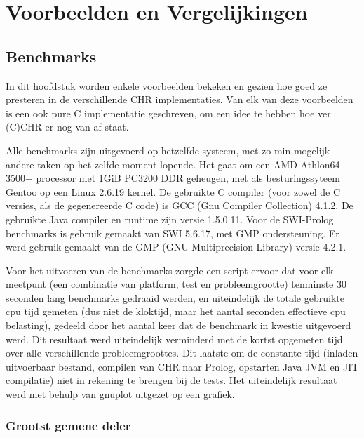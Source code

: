 \chapter{Voorbeelden en Vergelijkingen} \label{chap:bench}

\section{Benchmarks}

\newcommand{\benchfig}[2]{
\begin{figure}[htbp]
\begin{center}
\includevector{1}{fig/bench-#1}
\caption{\label{fig:bench-#1}#2}
\end{center}
\end{figure}
}

In dit hoofdstuk worden enkele voorbeelden bekeken en gezien hoe goed ze presteren in de verschillende CHR implementaties. Van elk van deze voorbeelden is een ook pure C implementatie geschreven, om een idee te hebben hoe ver (C)CHR er nog van af staat.

Alle benchmarks zijn uitgevoerd op hetzelfde systeem, met zo min mogelijk andere taken op het zelfde moment lopende. Het gaat om een AMD Athlon64 3500+ processor met 1GiB PC3200 DDR geheugen, met als besturingssyteem Gentoo op een Linux 2.6.19 kernel. De gebruikte C compiler (voor zowel de C versies, als de gegenereerde C code) is GCC (Gnu Compiler Collection) 4.1.2. De gebruikte Java compiler en runtime zijn versie 1.5.0.11. Voor de SWI-Prolog benchmarks is gebruik gemaakt van SWI 5.6.17, met GMP ondersteuning. Er werd gebruik gemaakt van de GMP (GNU Multiprecision Library) versie 4.2.1.

Voor het uitvoeren van de benchmarks zorgde een script ervoor dat voor elk meetpunt (een combinatie van platform, test en probleemgrootte) tenminste 30 seconden lang benchmarks gedraaid werden, en uiteindelijk de totale gebruikte cpu tijd gemeten (dus niet de kloktijd, maar het aantal seconden effectieve cpu belasting), gedeeld door het aantal keer dat de benchmark in kwestie uitgevoerd werd. Dit resultaat werd uiteindelijk verminderd met de kortst opgemeten tijd over alle verschillende probleemgroottes. Dit laatste om de constante tijd (inladen uitvoerbaar bestand, compilen van CHR naar Prolog, opstarten Java JVM en JIT compilatie) niet in rekening te brengen bij de tests. Het uiteindelijk resultaat werd met behulp van gnuplot uitgezet op een grafiek.

\subsection{Grootst gemene deler} \label{sec:bench-gcd}

